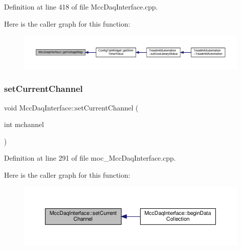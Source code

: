 Definition at line 418 of file Mcc\+Daq\+Interface.\+cpp.

Here is the caller graph for this function\+:
\nopagebreak
\begin{figure}[H]
\begin{center}
\leavevmode
\includegraphics[width=350pt]{class_mcc_daq_interface_a2386ad8fa783fdb1dd53e8678ce0e7bb_icgraph}
\end{center}
\end{figure}
\mbox{\label{class_mcc_daq_interface_a3332c6e8afb289d24a23ef0c08596473}} 
\subsubsection{\texorpdfstring{set\+Current\+Channel}{setCurrentChannel}}
{\footnotesize\ttfamily void Mcc\+Daq\+Interface\+::set\+Current\+Channel (\begin{DoxyParamCaption}\item[{int}]{mchannel }\end{DoxyParamCaption})\hspace{0.3cm}{\ttfamily [signal]}}



Definition at line 291 of file moc\+\_\+\+Mcc\+Daq\+Interface.\+cpp.

Here is the caller graph for this function\+:
\nopagebreak
\begin{figure}[H]
\begin{center}
\leavevmode
\includegraphics[width=350pt]{class_mcc_daq_interface_a3332c6e8afb289d24a23ef0c08596473_icgraph}
\end{center}
\end{figure}
\mbox{\label{class_mcc_daq_interface_a3024b53b897a0e7778fd5c2df7932999}} 
